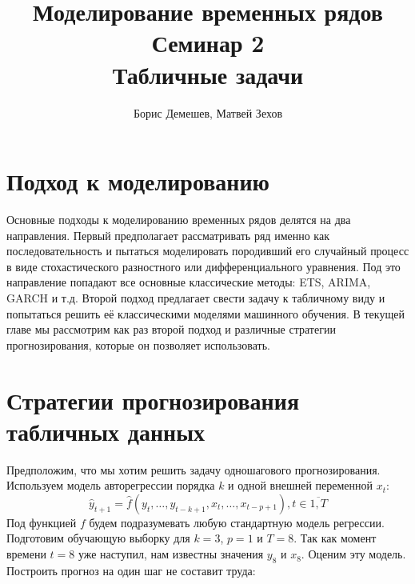 \documentclass[12pt,fleqn]{article}
\begin{document}
\title{Моделирование временных рядов\\Семинар 2\\Табличные задачи}
\author{Борис Демешев, Матвей Зехов}
\date{}
\maketitle

\section{Подход к моделированию}

Основные подходы к моделированию временных рядов делятся на два направления. Первый предполагает рассматривать ряд именно как последовательность и пытаться моделировать породивший его случайный процесс в виде стохастического разностного или дифференциального уравнения. Под это направление попадают все основные классические методы: ETS, ARIMA, GARCH и т.д. Второй подход предлагает свести задачу к табличному виду и попытаться решить её классическими моделями машинного обучения. В текущей главе мы рассмотрим как раз второй подход и различные стратегии прогнозирования, которые он позволяет использовать.

\section{Стратегии прогнозирования табличных данных}

Предположим, что мы хотим решить задачу одношагового прогнозирования. Используем модель авторегрессии порядка $k$ и одной внешней переменной $x_t$:  
$$
\hat{y}_{t+1} = \hat{f}(y_t, \ldots, y_{t-k+1}, x_{t}, \ldots, x_{t-p+1}), t \in \overline{1, T}
$$
 Под функцией $f$ будем подразумевать любую стандартную модель регрессии. Подготовим обучающую выборку для $k=3$, $p=1$ и $T=8$. Так как момент времени $t=8$ уже наступил, нам известны значения $y_8$ и $x_8$. Оценим эту модель. Построить прогноз на один шаг не составит труда:
\end{document}
